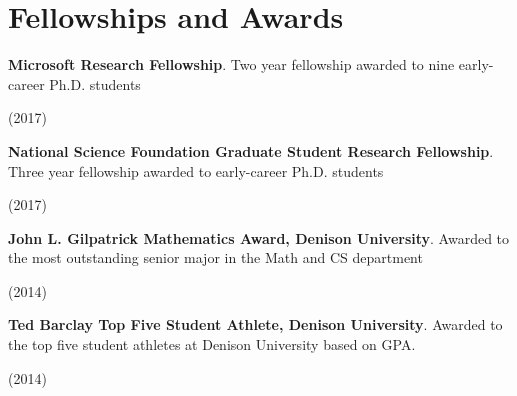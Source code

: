 \documentclass[letterpaper,10pt]{article}
\newcommand{\sidebyside}[2]{
  \begin{minipage}[t]{.75\textwidth}
    \raggedright{}
    #2
  \end{minipage}
  \hspace{.01\textwidth}
    \begin{minipage}[t]{.205\textwidth}
    \raggedleft
    #1
  \end{minipage}
}
\newcommand{\trio}[3]{\sidebyside{#3}{\textbf{#1}. #2}}
\begin{document}
\section{Fellowships and Awards}
\begin{smenumerate}
\item \trio{Microsoft Research Fellowship}{Two year fellowship awarded to
  nine early-career Ph.D. students}{(2017)}

\item \trio{National Science Foundation Graduate Student Research
  Fellowship}{Three year fellowship awarded to early-career
  Ph.D. students}{(2017)}

\item \trio{John L. Gilpatrick Mathematics Award, Denison University}{Awarded to
  the most outstanding senior major in the Math and CS department}{(2014)}

\item \trio{Ted Barclay Top Five Student Athlete, Denison University}{Awarded to
  the top five student athletes at Denison University based on GPA.}{(2014)}
\end{smenumerate}
\end{document}
